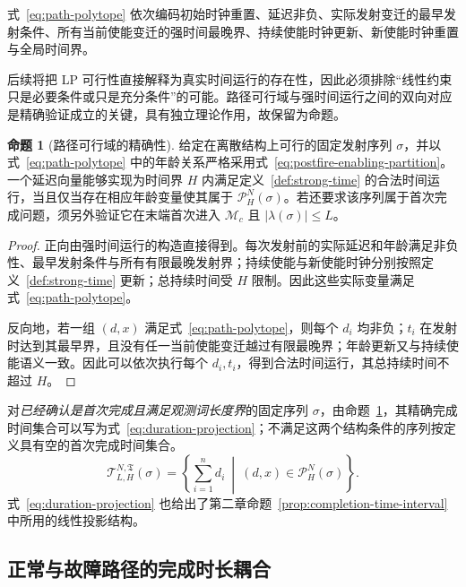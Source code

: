 \documentclass[master,fontset=ubuntu]{shnuthesis}
\theoremstyle{definition}
\newtheorem{thesisproposition}{命题}
\begin{document}
式~\eqref{eq:path-polytope} 依次编码初始时钟重置、延迟非负、实际发射变迁的最早发射条件、所有当前使能变迁的强时间最晚界、持续使能时钟更新、新使能时钟重置与全局时间界。

后续将把 LP 可行性直接解释为真实时间运行的存在性，因此必须排除“线性约束只是必要条件或只是充分条件”的可能。路径可行域与强时间运行之间的双向对应是精确验证成立的关键，具有独立理论作用，故保留为命题。

\begin{thesisproposition}[路径可行域的精确性]
\label{prop:path-polytope-exact}
给定在离散结构上可行的固定发射序列 $\sigma$，并以式~\eqref{eq:path-polytope} 中的年龄关系严格采用式~\eqref{eq:postfire-enabling-partition}。一个延迟向量能够实现为时间界 $H$ 内满足定义~\ref{def:strong-time} 的合法时间运行，当且仅当存在相应年龄变量使其属于 $\mathcal P_H^N(\sigma)$。若还要求该序列属于首次完成问题，须另外验证它在末端首次进入 $\mathcal M_c$ 且 $|\lambda(\sigma)|\leq L$。
\end{thesisproposition}

\begin{proof}
正向由强时间运行的构造直接得到。每次发射前的实际延迟和年龄满足非负性、最早发射条件与所有有限最晚发射界；持续使能与新使能时钟分别按照定义~\ref{def:strong-time} 更新；总持续时间受 \(H\) 限制。因此这些实际变量满足式~\eqref{eq:path-polytope}。

反向地，若一组 \((d,x)\) 满足式~\eqref{eq:path-polytope}，则每个 \(d_i\) 均非负；\(t_i\) 在发射时达到其最早界，且没有任一当前使能变迁越过有限最晚界；年龄更新又与持续使能语义一致。因此可以依次执行每个 \(d_i,t_i\)，得到合法时间运行，其总持续时间不超过 \(H\)。
\end{proof}

对\emph{已经确认是首次完成且满足观测词长度界}的固定序列 $\sigma$，由命题~\ref{prop:path-polytope-exact}，其精确完成时间集合可以写为式~\eqref{eq:duration-projection}；不满足这两个结构条件的序列按定义具有空的首次完成时间集合。
\begin{equation}
\mathcal T_{L,H}^{N,\mathfrak T}(\sigma)
=
\left\{
\sum_{i=1}^{n}d_i
\ \middle|\
(d,x)\in\mathcal P_H^N(\sigma)
\right\}.
\label{eq:duration-projection}
\end{equation}
式~\eqref{eq:duration-projection} 也给出了第二章命题~\ref{prop:completion-time-interval} 中所用的线性投影结构。

\subsection{正常与故障路径的完成时长耦合}
\end{document}

